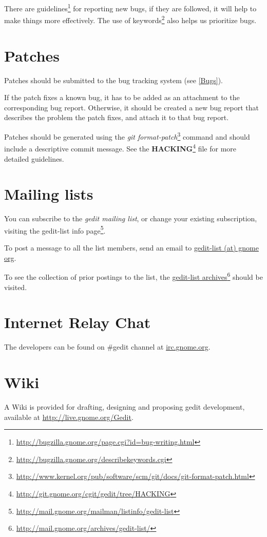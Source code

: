 There are guidelines\footnote{\url{http://bugzilla.gnome.org/page.cgi?id=bug-writing.html}} for reporting new bugs, if they are followed, it will help to make things more effectively. The use of keywords\footnote{\url{http://bugzilla.gnome.org/describekeywords.cgi}} also helps us prioritize bugs.

\section{Patches}\label{Patches}

Patches should be submitted to the bug tracking system (see \ref{Bugs}).

If the patch fixes a known bug, it has to be added as an attachment to the corresponding bug report. Otherwise, it should be created a new bug report that describes the problem the patch fixes, and attach it to that bug report.

Patches should be generated using the \textit{git format-patch}\footnote{\url{http://www.kernel.org/pub/software/scm/git/docs/git-format-patch.html}} command and should include a descriptive commit message. See the \textbf{HACKING}\footnote{\url{http://git.gnome.org/cgit/gedit/tree/HACKING}} file for more detailed guidelines.

\section{Mailing lists}\label{Mailing}

You can subscribe to the \emph{gedit mailing list}, or change your existing subscription, visiting the gedit-list info page\footnote{\url{http://mail.gnome.org/mailman/listinfo/gedit-list}}.

To post a message to all the list members, send an email to \href{mailto:gedit-list@gnome org}{gedit-list (at) gnome org}.

To see the collection of prior postings to the list, the \href{http://mail.gnome.org/archives/gedit-list/}{gedit-list archives}\footnote{\url{http://mail.gnome.org/archives/gedit-list/}} should be visited.

\section{Internet Relay Chat}\label{IRC}

The developers can be found on \#gedit channel at \url{irc.gnome.org}.

\section{Wiki}\label{Wiki}

A Wiki is provided for drafting, designing and proposing gedit development, available at \url{http://live.gnome.org/Gedit}.
